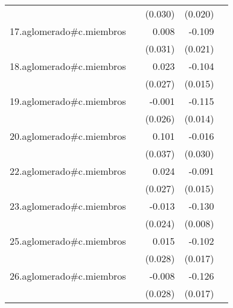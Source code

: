 {\begin{longtable}{l*{4}{D{.}{.}{-1}}}
            &                     &     (0.030)         &     (0.020)         &                     \\
\addlinespace
17.aglomerado#c.miembros&                     &       0.008         &      -0.109\sym{***}&                     \\
            &                     &     (0.031)         &     (0.021)         &                     \\
\addlinespace
18.aglomerado#c.miembros&                     &       0.023         &      -0.104\sym{***}&                     \\
            &                     &     (0.027)         &     (0.015)         &                     \\
\addlinespace
19.aglomerado#c.miembros&                     &      -0.001         &      -0.115\sym{***}&                     \\
            &                     &     (0.026)         &     (0.014)         &                     \\
\addlinespace
20.aglomerado#c.miembros&                     &       0.101\sym{**} &      -0.016         &                     \\
            &                     &     (0.037)         &     (0.030)         &                     \\
\addlinespace
22.aglomerado#c.miembros&                     &       0.024         &      -0.091\sym{***}&                     \\
            &                     &     (0.027)         &     (0.015)         &                     \\
\addlinespace
23.aglomerado#c.miembros&                     &      -0.013         &      -0.130\sym{***}&                     \\
            &                     &     (0.024)         &     (0.008)         &                     \\
\addlinespace
25.aglomerado#c.miembros&                     &       0.015         &      -0.102\sym{***}&                     \\
            &                     &     (0.028)         &     (0.017)         &                     \\
\addlinespace
26.aglomerado#c.miembros&                     &      -0.008         &      -0.126\sym{***}&                     \\
            &                     &     (0.028)         &     (0.017)         &                     \\

\end{longtable}}
